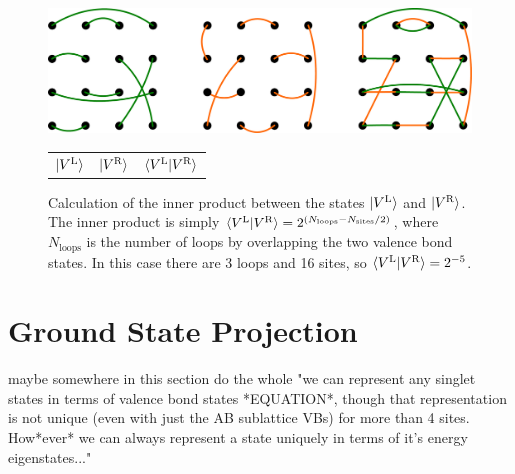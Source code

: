 
\begin{figure} { 
\centering
\includegraphics [width=5.5in]{./figures/made/overlap.pdf}
\begin{tabular*}{5.5in}{ccc}
\hspace{12mm}$\lvert {V^\text{L}} \rangle$& 
\hspace{39mm}$\lvert {V^\text{R}} \rangle$ \hspace{40mm}& 
\hspace{33mm}$\langle {V^\text{L}} \rvert V^\text{R} \rangle$ \hspace{5mm}\\
\end{tabular*}

 \caption[Illustration of valence bond state inner product calculation]{
 Calculation of the inner product between the states $\lvert {V^\text{L}} \rangle$ and $\lvert {V^\text{R}} \rangle$.
 The inner product is simply 
 $\langle {V^\text{L}} \rvert V^\text{R} \rangle = 2^{(N_{\text{loops}}-N_{\text{sites}}/2)}$, 
 where $N_{\text{loops}}$ is the number of loops  by overlapping the 
 two valence bond states.
 In this case there are 3 loops and 16 sites, so 
 $\langle {V^\text{L}} \rvert V^\text{R} \rangle = 2^{-5}$.
 }
 }
\label{overlap}
\end{figure}



\section{Ground State Projection} \label{gsp}
{\color{red} maybe somewhere in this section do the whole "we can represent any singlet states in
terms of valence bond states *EQUATION*, though that representation is not unique (even with just
the AB sublattice VBs) for more than 4 sites.  How*ever* we can always represent a state uniquely 
in terms of it's energy eigenstates..."}

